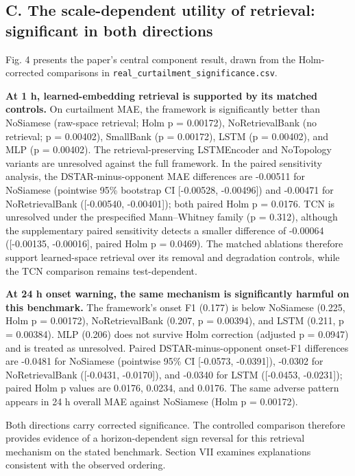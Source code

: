 \documentclass[
  10pt,
  a4paper,
]{article}
\begin{document}
\subsection{C. The scale-dependent utility of retrieval: significant in
both
directions}\label{c.-the-scale-dependent-utility-of-retrieval-significant-in-both-directions}

Fig. 4 presents the paper's central component result, drawn from the
Holm-corrected comparisons in
\texttt{real\_curtailment\_significance.csv}.

\textbf{At 1 h, learned-embedding retrieval is supported by its matched
controls.} On curtailment MAE, the framework is significantly better
than NoSiamese (raw-space retrieval; Holm p = 0.00172), NoRetrievalBank
(no retrieval; p = 0.00402), SmallBank (p = 0.00172), LSTM (p =
0.00402), and MLP (p = 0.00402). The retrieval-preserving LSTMEncoder
and NoTopology variants are unresolved against the full framework. In
the paired sensitivity analysis, the DSTAR-minus-opponent MAE
differences are -0.00511 for NoSiamese (pointwise 95\% bootstrap CI
{[}-0.00528, -0.00496{]}) and -0.00471 for NoRetrievalBank ({[}-0.00540,
-0.00401{]}); both paired Holm p = 0.0176. TCN is unresolved under the
prespecified Mann--Whitney family (p = 0.312), although the
supplementary paired sensitivity detects a smaller difference of
-0.00064 ({[}-0.00135, -0.00016{]}, paired Holm p = 0.0469). The matched
ablations therefore support learned-space retrieval over its removal and
degradation controls, while the TCN comparison remains test-dependent.

\textbf{At 24 h onset warning, the same mechanism is significantly
harmful on this benchmark.} The framework's onset F1 (0.177) is below
NoSiamese (0.225, Holm p = 0.00172), NoRetrievalBank (0.207, p =
0.00394), and LSTM (0.211, p = 0.00384). MLP (0.206) does not survive
Holm correction (adjusted p = 0.0947) and is treated as unresolved.
Paired DSTAR-minus-opponent onset-F1 differences are -0.0481 for
NoSiamese (pointwise 95\% CI {[}-0.0573, -0.0391{]}), -0.0302 for
NoRetrievalBank ({[}-0.0431, -0.0170{]}), and -0.0340 for LSTM
({[}-0.0453, -0.0231{]}); paired Holm p values are 0.0176, 0.0234, and
0.0176. The same adverse pattern appears in 24 h overall MAE against
NoSiamese (Holm p = 0.00172).

Both directions carry corrected significance. The controlled comparison
therefore provides evidence of a horizon-dependent sign reversal for
this retrieval mechanism on the stated benchmark. Section VII examines
explanations consistent with the observed ordering.
\end{document}
